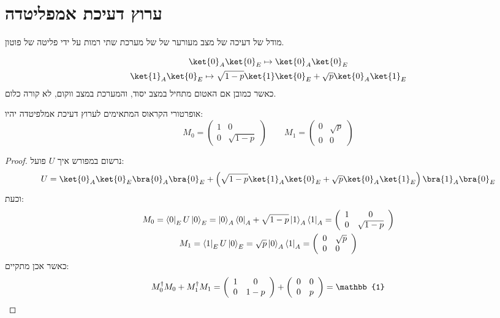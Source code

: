 \documentclass{tstextbook}
\begin{document}
\section{ערוץ דעיכת אמפליטדה}

\begin{definition}
מודל של דעיכה של מצב מעורער של של מערכת שתי רמות על ידי פליטה של פוטון.

\end{definition}
\begin{proposition}
\begin{gather*}\ket{0} _{A}\ket{0} _{E}\mapsto \ket{0} _{A}\ket{0} _{E}  \\\ket{1} _{A}\ket{0} _{E}\mapsto \sqrt{ 1-p }\ket{1} \ket{0} _{E}+\sqrt{ p }\ket{0} _{A}\ket{1} _{E}
\end{gather*}
כאשר כמובן אם האטום מתחיל במצב יסוד, והמערכת במצב ווקום, לא קורה כלום.

\end{proposition}
\begin{proposition}
אופרטורי הקראוס המתאימים לערוץ דעיכת אמלפיטדה יהיו:
$$M_{0}=\begin{pmatrix}1 & 0 \\0 & \sqrt{ 1-p }\end{pmatrix}\qquad M_{1}=\begin{pmatrix}0 & \sqrt{ p } \\0 & 0
\end{pmatrix}$$

\end{proposition}
\begin{proof}
נרשום במפורש איך \(U\) פועל:
$$U=\ket{0} _{A}\ket{0} _{E}\bra{0} _{A}\bra{0} _{E}+\left( \sqrt{ 1-p }\ket{1}_{A} \ket{0} _{E}+\sqrt{ p }\ket{0} _{A}\ket{1} _{E} \right)\bra{1} _{A}\bra{0} _{E}$$
וכעת:
\begin{gather*}M_{0}=\left\langle0\right|_{E}U\left|0\right\rangle_{E}=\left|0\right\rangle_{A}\left\langle0\right|_{A}+\sqrt{1-p}\left|1\right\rangle_{A}\left\langle1\right|_{A}=\left(\begin{array}{c c}{{1}}&{{0}}\\ {{0}}&{{\sqrt{1-p}}}\end{array}\right)\\ M_{1}=\left\langle1\right|_{E}U\left|0\right\rangle_{E}=\sqrt{p}\left|0\right\rangle_{A}\left\langle1\right|_{A}=\left(\begin{array}{l l}{{0}}&{{\sqrt{p}}}\\ {{0}}&{{0}}\end{array}\right) 
\end{gather*}
כאשר אכן מתקיים:
$${ M}_{0}^{\dagger}{ M}_{0}+{ M}_{1}^{\dagger}{ M}_{1}=\left(\begin{array}{c c}{{1}}&{{0}}\\ {{0}}&{{1-p}}\end{array}\right)+\left(\begin{array}{c c}{{0}}&{{0}}\\ {{0}}&{{p}}\end{array}\right)=\mathbb{1} $$

\end{proof}
\end{document}
